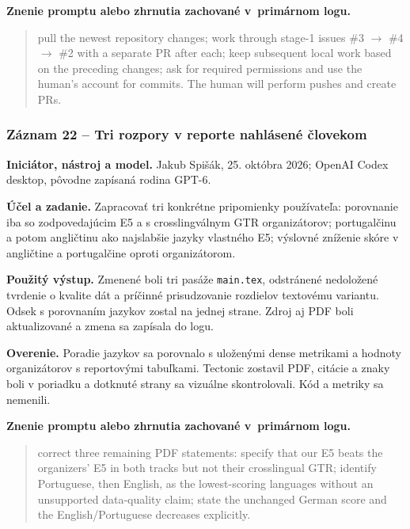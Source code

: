 \par\noindent\textbf{Znenie promptu alebo zhrnutia zachované v~primárnom logu.}

\begin{quote}\normalsize pull the newest repository changes; work through stage-1 issues \#3 $\to$ \#4 $\to$ \#2 with a separate PR after each; keep subsequent local work based on the preceding changes; ask for required permissions and use the human's account for commits. The human will perform pushes and create PRs.\end{quote}

\subsubsection*{Záznam 22 -- Tri rozpory v reporte nahlásené človekom}


\par\noindent \textbf{Iniciátor, nástroj a model.} Jakub Spišák, 25. októbra 2026; OpenAI Codex desktop, pôvodne zapísaná rodina GPT-6.\par\smallskip
\par\noindent \textbf{Účel a zadanie.} Zapracovať tri konkrétne pripomienky používateľa: porovnanie iba so zodpovedajúcim E5 a s crosslingválnym GTR organizátorov; portugalčinu a potom angličtinu ako najslabšie jazyky vlastného E5; výslovné zníženie skóre v angličtine a portugalčine oproti organizátorom.\par\smallskip
\par\noindent \textbf{Použitý výstup.} Zmenené boli tri pasáže \texttt{main.\allowbreak{}tex}, odstránené nedoložené tvrdenie o kvalite dát a príčinné prisudzovanie rozdielov textovému variantu. Odsek s porovnaním jazykov zostal na jednej strane. Zdroj aj PDF boli aktualizované a zmena sa zapísala do logu.\par\smallskip
\par\noindent \textbf{Overenie.} Poradie jazykov sa porovnalo s uloženými dense metrikami a hodnoty organizátorov s reportovými tabuľkami. Tectonic zostavil PDF, citácie a znaky boli v poriadku a dotknuté strany sa vizuálne skontrolovali. Kód a metriky sa nemenili.\par\smallskip

\par\noindent\textbf{Znenie promptu alebo zhrnutia zachované v~primárnom logu.}

\begin{quote}\normalsize correct three remaining PDF statements: specify that our E5 beats the organizers' E5 in both tracks but not their crosslingual GTR; identify Portuguese, then English, as the lowest-scoring languages without an unsupported data-quality claim; state the unchanged German score and the English/Portuguese decreases explicitly.\end{quote}

